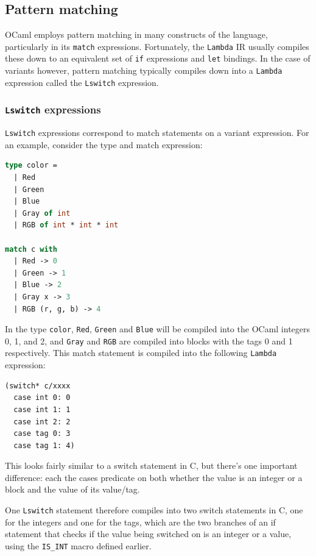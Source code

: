 \documentclass[12pt,a4paper,twoside,openright]{report}
\begin{document}
\subsection{Pattern matching}

OCaml employs pattern matching in many constructs of the language, particularly 
in its \texttt{match} expressions. Fortunately, the \texttt{Lambda} IR usually 
compiles these down to an equivalent set of \texttt{if} expressions and 
\texttt{let} bindings. In the case of variants however, pattern matching 
typically compiles down into a \texttt{Lambda} expression called the 
\texttt{Lswitch} expression.

\subsubsection{\texttt{Lswitch} expressions}

\texttt{Lswitch} expressions correspond to match statements on a variant 
expression. For an example, consider the type and match expression:

\begin{lstlisting}[language=Caml]
type color =
  | Red
  | Green
  | Blue
  | Gray of int
  | RGB of int * int * int

match c with
  | Red -> 0
  | Green -> 1
  | Blue -> 2
  | Gray x -> 3
  | RGB (r, g, b) -> 4
\end{lstlisting}

In the type \texttt{color}, \texttt{Red}, \texttt{Green} and \texttt{Blue} will 
be compiled into the OCaml integers 0, 1, and 2, and \texttt{Gray} and 
\texttt{RGB} are compiled into blocks with the tags 0 and 1 respectively. This 
match statement is compiled into the following \texttt{Lambda} expression:

\begin{lstlisting}
(switch* c/xxxx
  case int 0: 0
  case int 1: 1
  case int 2: 2
  case tag 0: 3
  case tag 1: 4)
\end{lstlisting}

This looks fairly similar to a switch statement in C, but there's one 
important difference: each the cases predicate on both whether the value is an 
integer or a block and the value of its value/tag.

One \texttt{Lswitch} statement therefore compiles into two switch statements in 
C, one for the integers and one for the tags, which are the two branches of an 
if statement that checks if the value being switched on is an integer or a 
value, using the \verb|IS_INT| macro defined earlier.
\end{document}
